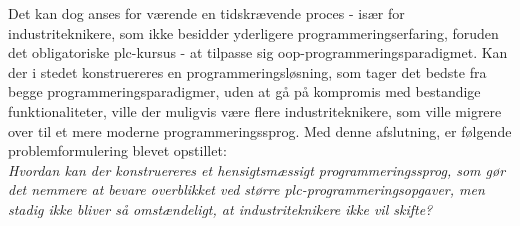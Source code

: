 Det kan dog anses for værende en tidskrævende proces - især for industriteknikere, som ikke besidder yderligere programmeringserfaring, foruden det obligatoriske \gls{plc}-kursus - at tilpasse sig \gls{oop}-programmeringsparadigmet\cite{dislikes_oop}. 
Kan der i stedet konstruereres en programmeringsløsning, som tager det bedste fra begge programmeringsparadigmer, uden at gå på kompromis med bestandige funktionaliteter, ville der muligvis være flere industriteknikere, som ville migrere over til et mere moderne programmeringssprog. Med denne afslutning, er følgende problemformulering blevet opstillet: \\

\noindent\textit{Hvordan kan der konstruereres et hensigtsmæssigt programmeringssprog, som gør det nemmere at bevare overblikket ved større \gls{plc}-programmeringsopgaver, men stadig ikke bliver så omstændeligt, at industriteknikere ikke vil skifte?}